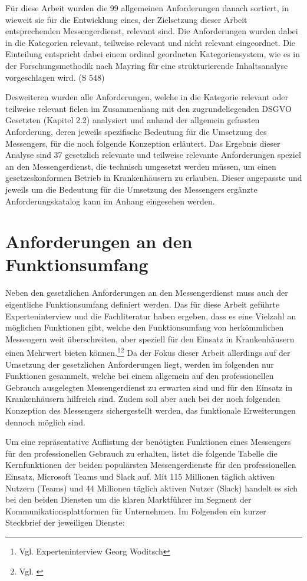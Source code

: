 Für diese Arbeit wurden die 99 allgemeinen Anforderungen danach sortiert, in wieweit sie für die Entwicklung eines, der Zielsetzung dieser Arbeit entsprechenden Messengerdienst, relevant sind. Die Anforderungen wurden dabei in die Kategorien relevant, teilweise relevant und nicht relevant eingeordnet. Die Einteilung entspricht dabei einem ordinal geordneten Kategoriensystem, wie es in der Forschungsmethodik nach Mayring für eine strukturierende Inhaltsanalyse vorgeschlagen wird. (S 548) 

Desweiteren wurden alle Anforderungen, welche in die Kategorie relevant oder teilweise relevant fielen im Zusammenhang mit den zugrundeliegenden DSGVO Gesetzten (Kapitel 2.2) analysiert und anhand der allgemein gefassten Anforderung, deren jeweils spezifische Bedeutung für die Umsetzung des Messengers, für die noch folgende Konzeption erläutert. 
Das Ergebnis dieser Analyse sind 37 gesetzlich relevante und teilweise relevante Anforderungen speziel an den Messengerdienst, die technisch umgesetzt werden müssen, um einen gesetzeskonformen Betrieb in Krankenhäusern zu erlauben. Dieser angepasste und jeweils um die Bedeutung für die Umsetzung des Messengers ergänzte Anforderungskatalog kann im Anhang eingesehen werden.

\section{Anforderungen an den Funktionsumfang}\label{section:pdimsbd}
Neben den gesetzlichen Anforderungen an den Messengerdienst muss auch der eigentliche Funktionsumfang definiert werden. Das für diese Arbeit geführte Experteninterview und die Fachliteratur haben ergeben, dass es eine Vielzahl an möglichen Funktionen gibt, welche den Funktionsumfang von herkömmlichen Messengern weit überschreiten, aber speziell für den Einsatz in Krankenhäusern einen Mehrwert bieten können.\footnote{Vgl. Experteninterview Georg Woditsch}\footnote{Vgl. \cite[S. 19 4.]{Khan2020}}
Da der Fokus dieser Arbeit allerdings auf der Umsetzung der gesetzlichen Anforderungen liegt, werden im folgenden nur Funktionen gesammelt, welche bei einem allgemein auf den professionellen Gebrauch ausgelegten Messengerdienst zu erwarten sind und für den Einsatz in Krankenhäusern hilfreich sind. Zudem soll aber auch bei der noch folgenden Konzeption des Messengers sichergestellt werden, das funktionale Erweiterungen dennoch möglich sind.

Um eine repräsentative Auflistung der benötigten Funktionen eines Messengers für den professionellen Gebrauch zu erhalten, listet die folgende Tabelle die Kernfunktionen der beiden populärsten Messengerdienste für den professionellen Einsatz, Microsoft Teams und Slack auf.
Mit 115 Millionen täglich aktiven Nutzern (Teams) und 44 Millionen täglich aktiven Nutzer (Slack) handelt es sich bei den beiden Diensten um die klaren Marktführer im Segment der Kommunikationsplattformen für Unternehmen. Im Folgenden ein kurzer Steckbrief der jeweiligen Dienste:


